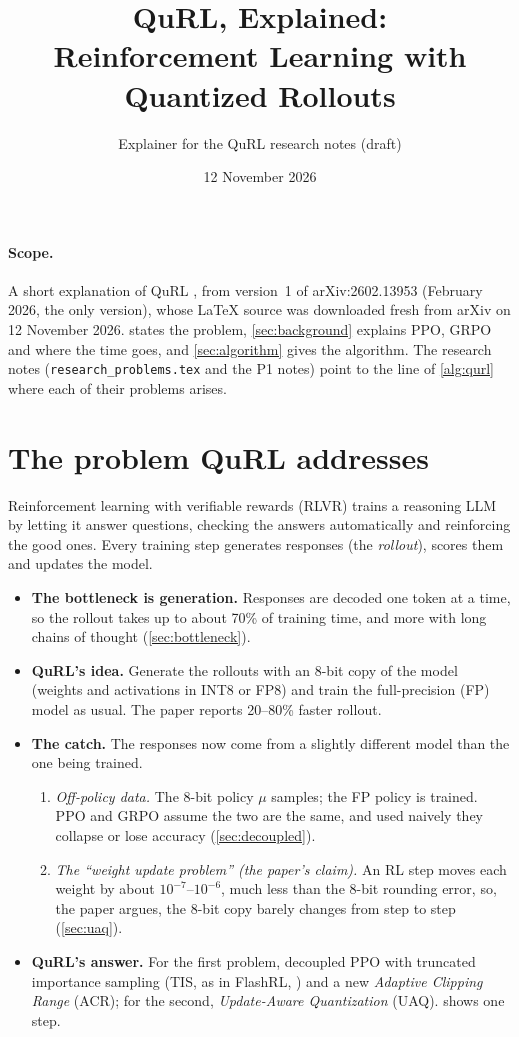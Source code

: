 \documentclass[11pt]{article}
\title{QuRL, Explained:\\Reinforcement Learning with Quantized Rollouts}
\author{Explainer for the QuRL research notes (draft)}
\date{12 November 2026}
\begin{document}
\maketitle

\paragraph{Scope.} A short explanation of QuRL \citep{li2026qurl}, from version~1 of arXiv:2602.13953 (February 2026, the only version), whose LaTeX source was downloaded fresh from arXiv on 12 November 2026.  states the problem, \cref{sec:background} explains PPO, GRPO and where the time goes, and \cref{sec:algorithm} gives the algorithm. The research notes (\texttt{research\_problems.tex} and the P1 notes) point to the line of \cref{alg:qurl} where each of their problems arises.

\section{The problem QuRL addresses}\label{sec:problem}
Reinforcement learning with verifiable rewards (RLVR) trains a reasoning LLM by letting it answer questions, checking the answers automatically and reinforcing the good ones. Every training step generates responses (the \emph{rollout}), scores them and updates the model.
\begin{itemize}
\item \textbf{The bottleneck is generation.} Responses are decoded one token at a time, so the rollout takes up to about 70\% of training time, and more with long chains of thought (\cref{sec:bottleneck}).
\item \textbf{QuRL's idea.} Generate the rollouts with an 8-bit copy of the model (weights and activations in INT8 or FP8) and train the full-precision (FP) model as usual. The paper reports 20--80\% faster rollout.
\item \textbf{The catch.} The responses now come from a slightly different model than the one being trained.
  \begin{enumerate}
  \item \emph{Off-policy data.} The 8-bit policy $\mu$ samples; the FP policy is trained. PPO and GRPO assume the two are the same, and used naively they collapse or lose accuracy (\cref{sec:decoupled}).
  \item \emph{The ``weight update problem'' (the paper's claim).} An RL step moves each weight by about $10^{-7}$--$10^{-6}$, much less than the 8-bit rounding error, so, the paper argues, the 8-bit copy barely changes from step to step (\cref{sec:uaq}).
  \end{enumerate}
\item \textbf{QuRL's answer.} For the first problem, decoupled PPO with truncated importance sampling (TIS, as in FlashRL, \citealp{yao2025flashrl}) and a new \emph{Adaptive Clipping Range} (ACR); for the second, \emph{Update-Aware Quantization} (UAQ).  shows one step.
\end{itemize}
\end{document}
